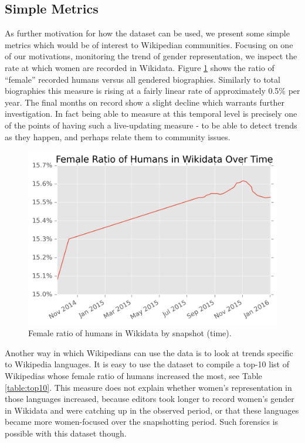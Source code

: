 \documentclass[letterpaper]{article}
\begin{document}
\subsection{Simple Metrics}
As further motivation for how the dataset can be used, we present some simple metrics which would be of interest to Wikipedian communities. Focusing on one of our motivations, monitoring the trend of gender representation, we inspect the rate at which women are recorded in Wikidata. Figure \ref{fig:frb} shows the ratio of ``female'' recorded humans versus all gendered biographies. Similarly to total biographies this measure is rising at a fairly linear rate of approximately 0.5\% per year. The final months on record show a slight decline which warrants further investigation. In fact being able to measure at this temporal level is precisely one of the points of having such a live-updating measure - to be able to detect trends as they happen, and perhaps relate them to community issues.

\begin{figure}
\includegraphics[scale=0.6]{figures/frbwikidata.png}
\caption{Female ratio of humans in Wikidata by snapshot (time).}
\label{fig:frb}
\end{figure}

Another way in which Wikipedians can use the data is to look at trends specific to Wikipedia languages. It is easy to use the dataset to compile a top-10 list of Wikipedias whose female ratio of humans increased the most, see Table \ref{table:top10}. This measure does not explain whether women's representation in those languages increased, because editors took longer to record women's gender in Wikidata and were catching up in the observed period, or that these languages became more women-focused over the snapshotting period. Such forensics is possible with this dataset though.
\end{document}

